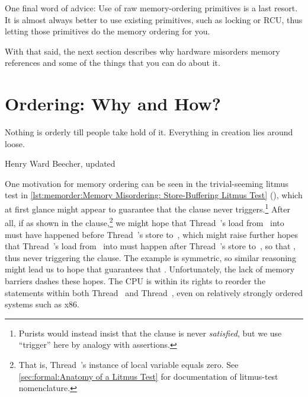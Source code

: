 One final word of advice:
Use of raw memory-ordering primitives is a last resort.
It is almost always better to use existing primitives, such as locking
or RCU, thus letting those primitives do the memory ordering for you.

With that said, the next section describes why hardware misorders memory
references and some of the things that you can do about it.

\section{Ordering:
		   Why and How?}
\label{sec:memorder:Ordering: Why and How?}
%
\epigraph{Nothing is orderly till people take hold of it.
	  Everything in creation lies around loose.}
	 {Henry Ward Beecher, updated}

One motivation for memory ordering can be seen in the trivial-seeming
litmus test in
\cref{lst:memorder:Memory Misordering: Store-Buffering Litmus Test}
(),
which at first glance might
appear to guarantee that the  clause never triggers.\footnote{
	Purists would instead insist that the  clause is
	never \emph{satisfied}, but we use ``trigger'' here by
	analogy with assertions.}
After all, if  as shown in the  clause,\footnote{
	That is, Thread~'s instance of local variable 
	equals zero.
	See \cref{sec:formal:Anatomy of a Litmus Test}
	for documentation of litmus-test nomenclature.}
we might hope that Thread~'s load from~ into 
must have happened before Thread~'s store to~, which
might raise further hopes that Thread~'s load from~
into  must happen after Thread~'s store to~,
so that , thus never triggering the  clause.
The example is symmetric, so similar reasoning might lead
us to hope that  guarantees that .
Unfortunately, the lack of memory barriers dashes these hopes.
The CPU is within its rights to reorder
the statements within both Thread~ and Thread~,
even on relatively strongly ordered systems such as x86.

\begin{listing}

\caption{Memory Misordering:
			     Store-Buffering Litmus Test}
\label{lst:memorder:Memory Misordering: Store-Buffering Litmus Test}
\end{listing}


